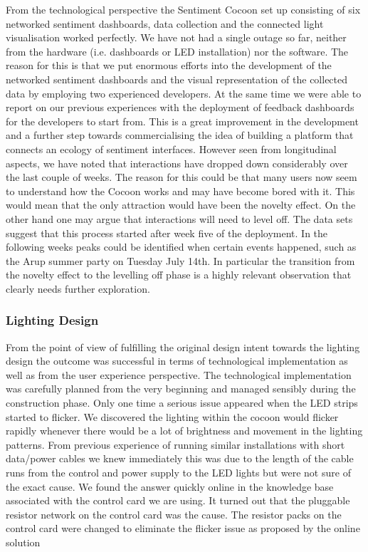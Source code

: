 From the technological perspective the Sentiment Cocoon set up consisting of six networked sentiment dashboards, data collection and the connected light visualisation worked perfectly. We have not had a single outage so far, neither from the hardware (i.e. dashboards or LED installation) nor the software. The reason for this is that we put enormous efforts into the development of the networked sentiment dashboards and the visual representation of the collected data by employing two experienced developers. At the same time we were able to report on our previous experiences with the deployment of feedback dashboards for the developers to start from. This is a great improvement in the development and a further step towards commercialising the idea of building a platform that connects an ecology of sentiment interfaces. 
However seen from longitudinal aspects, we have noted that interactions have dropped down considerably over the last couple of weeks. The reason for this could be that many users now seem to understand how the Cocoon works and may have become bored with it. This would mean that the only attraction would have been the novelty effect. On the other hand one may argue that interactions will need to level off. The data sets suggest that this process started after week five of the deployment. In the following weeks peaks could be identified when certain events happened, such as the Arup summer party on Tuesday July 14th. 
In particular the transition from the novelty effect to the levelling off phase is a highly relevant observation that clearly needs further exploration.

\subsubsection*{Lighting Design}

From the point of view of fulfilling the original design intent towards the lighting design the outcome was successful in terms of technological implementation as well as from the user experience perspective. The technological implementation was carefully planned from the very beginning and managed sensibly during the construction phase. Only one time a serious issue appeared when the LED strips started to flicker. We discovered the lighting within the cocoon would flicker rapidly whenever there would be a lot of brightness and movement in the lighting patterns. From previous experience of running similar installations with short data/power cables we knew immediately this was due to the length of the cable runs from the control and power supply to the LED lights but were not sure of the exact cause. We found the answer quickly online in the knowledge base associated with the control card we are using. It turned out that the pluggable resistor network on the control card was the cause. The resistor packs on the control card were changed to eliminate the flicker issue as proposed by the online solution
 
